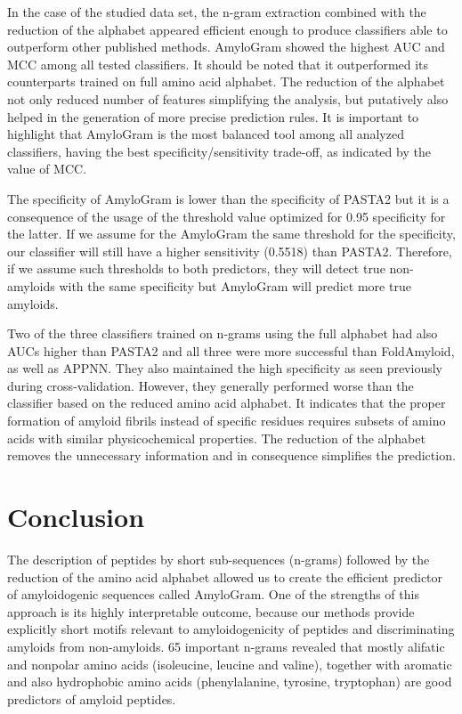 \documentclass[fleqn,10pt,twoside]{gcb15submission}
\begin{document}
  In the case of the studied data set, the n-gram extraction combined with the 
reduction of the alphabet appeared efficient enough to produce classifiers able 
to outperform other published methods. AmyloGram showed the highest AUC and MCC 
among all tested classifiers. It should be noted that it outperformed its 
counterparts trained on full amino acid alphabet. The reduction of the 
alphabet not only reduced number of features simplifying the analysis, but 
putatively also helped in the generation of more
precise prediction rules. It is important to highlight that AmyloGram 
is the most balanced tool among all analyzed classifiers, having the best 
specificity/sensitivity trade-off, as indicated by the value of MCC.

  The specificity of AmyloGram is lower than the specificity of PASTA2 but it is 
a consequence of the usage of the threshold value optimized for 0.95 specificity 
for the latter. If we assume for the AmyloGram the same threshold for the 
specificity, our classifier will still have a higher sensitivity (0.5518) than 
PASTA2. Therefore, if we assume such thresholds to both predictors, they will 
detect true non-amyloids with the same specificity but AmyloGram will predict 
more true amyloids. 

  Two of the three classifiers trained on  n-grams using the full alphabet 
had also AUCs higher than PASTA2 and all three were more successful than 
FoldAmyloid, as well as APPNN. They also maintained the high specificity as seen 
previously during cross-validation. However, they generally performed worse than 
the classifier based on the reduced amino acid alphabet. It indicates that the
proper formation of amyloid fibrils instead of specific residues
requires subsets of amino acids with similar physicochemical properties. The 
reduction of the alphabet removes the unnecessary information and in consequence 
simplifies the prediction.
  

\section{Conclusion}

The description of peptides by short sub-sequences (n-grams) followed by the 
reduction of the amino acid alphabet allowed us to create the efficient 
predictor of amyloidogenic sequences called AmyloGram. One of the strengths of 
this approach is its highly interpretable outcome, because our methods provide 
explicitly short motifs relevant to amyloidogenicity of peptides and 
discriminating amyloids from  non-amyloids. 65 important n-grams revealed that 
mostly alifatic and nonpolar amino acids (isoleucine, leucine and valine), 
together with aromatic and also hydrophobic amino acids (phenylalanine, 
tyrosine, tryptophan)  are good predictors of amyloid peptides.
\end{document}
